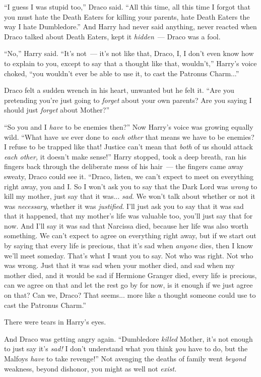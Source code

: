 ``I guess I was stupid too,'' Draco said. ``All this time, all this time I forgot that you must hate the Death Eaters for killing your parents, hate Death Eaters the way I hate Dumbledore.'' And Harry had never said anything, never reacted when Draco talked about Death Eaters, kept it \emph{hidden}~--- Draco was a fool.

``No,'' Harry said. ``It's not~--- it's not like that, Draco, I, I don't even know how to explain to you, except to say that a thought like that, wouldn't,'' Harry's voice choked, ``you wouldn't ever be able to use it, to cast the Patronus Charm...''

Draco felt a sudden wrench in his heart, unwanted but he felt it. ``Are you pretending you're just going to \emph{forget} about your own parents? Are you saying I should just \emph{forget} about Mother?''

``So you and I \emph{have} to be enemies then?'' Now Harry's voice was growing equally wild. ``What have \emph{we} ever done to \emph{each other} that means we have to be enemies? I refuse to be trapped like that! Justice can't mean that \emph{both} of us should attack \emph{each other,} it doesn't make sense!'' Harry stopped, took a deep breath, ran his fingers back through the deliberate mess of his hair~--- the fingers came away sweaty, Draco could see it. ``Draco, listen, we can't expect to meet on everything right away, you and I. So I won't ask you to say that the Dark Lord was \emph{wrong} to kill my mother, just say that it was... \emph{sad}. We won't talk about whether or not it was \emph{necessary}, whether it was \emph{justified}. I'll just ask you to say that it was sad that it happened, that my mother's life was valuable too, you'll just say that for now. And I'll say it was sad that Narcissa died, because her life was also worth something. We can't expect to agree on everything right away, but if we start out by saying that every life is precious, that it's sad when \emph{anyone} dies, then I know we'll meet someday. That's what I want you to say. Not who was right. Not who was wrong. Just that it was sad when your mother died, and sad when my mother died, and it would be sad if Hermione Granger died, every life is precious, can we agree on that and let the rest go by for now, is it enough if we just agree on that? Can we, Draco? That seems... more like a thought someone could use to cast the Patronus Charm.''

There were tears in Harry's eyes.

And Draco was getting angry again. ``Dumbledore \emph{killed} Mother, it's not enough to just say it's \emph{sad!} I don't understand what you think \emph{you} have to do, but the Malfoys \emph{have} to take revenge!'' Not avenging the deaths of family went \emph{beyond} weakness, beyond dishonor, you might as well not \emph{exist.}

